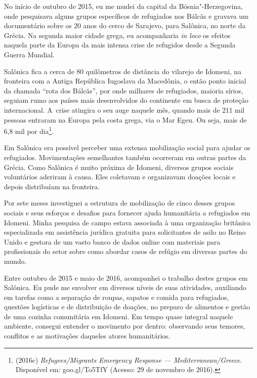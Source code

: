 
\vspace{-2em}
No início de outubro de 2015, eu me mudei da capital da Bósnia"-Herzegovina, 
onde pesquisava alguns grupos específicos de refugiados nos Bálcãs e
gravava um documentário sobre os 20 anos do cerco de Sarajevo, para
Salônica, no norte da Grécia. Na segunda maior cidade grega, eu
acompanharia \textit{in loco} os efeitos naquela parte da Europa da mais
 intensa crise de refugidos desde a Segunda Guerra Mundial.

Salônica fica a cerca de 80 quilômetros de distância do vilarejo de
Idomeni, na fronteira com a Antiga República Iugoslava da Macedônia,
o então ponto inicial da chamada ``rota dos Bálcãs'', por onde milhares
de refugiados, maioria sírios, seguiam rumo aos países
mais desenvolvidos do continente em busca de proteção internacional. A~crise atingira o seu auge naquele mês, quando mais de 211 mil pessoas
entraram na Europa pela costa grega, via o Mar Egeu. Ou seja, mais de
6,8 mil por dia\footnote{ (2016c) \emph{Refugees/Migrants Emergency Response ---
Mediterranean/Greece}. Disponível em:
goo.gl/To5TfY (Acesso: 29 de
novembro de 2016).}.

Em Salônica era possível perceber uma extensa mobilização social para ajudar os
refugiados. Movimentações semelhantes também ocorreram em outras partes da
Grécia. Como Salônica é muito próxima de Idomeni, diversos grupos sociais
voluntários aderiram à causa. Eles coletavam e organizavam doações locais e
depois distribuíam na fronteira. 


Por sete meses investiguei a estrutura de mobilização de cinco desses grupos
sociais e seus esforços e desafios para fornecer
ajuda humanitária a refugiados em Idomeni. Minha pesquisa de campo
estava associada à uma organização britânica especializada em
assistência jurídica gratuita para solicitantes de asilo no Reino Unido
e gestora de um vasto banco de dados online com materiais para
profissionais do setor sobre como abordar casos de refúgio em diversas
partes do mundo.

Entre outubro de 2015 e maio de 2016, acompanhei o trabalho destes
grupos em Salônica. Eu pude me envolver em diversos níveis de suas atividades,
auxiliando em tarefas como a separação de roupas, sapatos e comida para
refugiados, questões logísticas e de distribuição de doações, no
preparo de alimentos e gestão de uma cozinha comunitária em Idomeni. Em
tempo quase integral naquele ambiente, consegui entender o movimento por
dentro: observando seus temores, conflitos e as motivações daqueles
atores humanitários.


